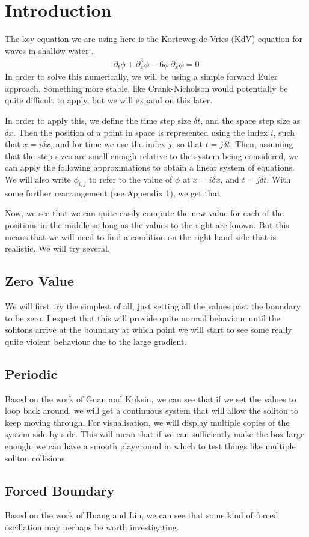 \section{Introduction}\label{sec:intro}

The key equation we are using here is the Korteweg-de-Vries (KdV) equation for waves in shallow water \cite{kdveqn}.
\begin{align}
\partial_{t} \phi + \partial_{x}^3 \phi - 6 \phi \  \partial_{x} \phi = 0
\label{eq:kdv}
\end{align}
In order to solve this numerically, we will be using a simple forward Euler approach. Something more stable, like Crank-Nicholson would potentially be quite difficult to apply, but we will expand on this later.

\vs
In order to apply this, we define the time step size $\delta t$, and the space step size as $\delta x$. Then the position of a point in space is represented using the index $i$, such that $x = i \delta x$, and for time we use the index $j$, so that $t = j \delta t$. Then, assuming that the step sizes are small enough relative to the system being considered, we can apply the following approximations to obtain a linear system of equations. We will also write $\phi_{i,j }$ to refer to the value of $\phi$ at $x = i \delta x$, and $t = j \delta t$.
With some further rearrangement (see Appendix 1), we get that
\tbc

Now, we see that we can quite easily compute the new value for each of the positions in the middle so long as the values to the right are known. But this means that we will need to find a condition on the right hand side that is realistic. We will try several.

\subsection{Zero Value}
We will first try the simplest of all, just setting all the values past the boundary to be zero. I expect that this will provide quite normal behaviour until the solitons arrive at the boundary at which point we will start to see some really quite violent behaviour due to the large gradient.

\subsection{Periodic}
Based on the work of Guan and Kuksin, we can see that if we set the values to loop back around, we will get a continuous system that will allow the soliton to keep moving through. For visualisation, we will display multiple copies of the system side by side. This will mean that if we can sufficiently make the box large enough, we can have a smooth playground in which to test things like multiple soliton collisions

\subsection{Forced Boundary}
Based on the work of Huang and Lin, we can see that some kind of forced oscillation may perhaps be worth investigating.

